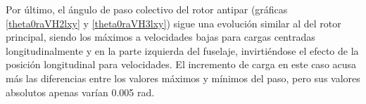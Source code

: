 Por último, el ángulo de paso colectivo del rotor antipar (gráficas \ref{theta0raVH2lxy} y \ref{theta0raVH3lxy}) sigue una evolución similar al del rotor principal, siendo los máximos a velocidades bajas para cargas centradas longitudinalmente y en la parte izquierda del fuselaje, invirtiéndose el efecto de la posición longitudinal para velocidades. El incremento de carga en este caso acusa más las diferencias entre los valores máximos y mínimos del paso, pero sus valores absolutos apenas varían 0.005 rad.
